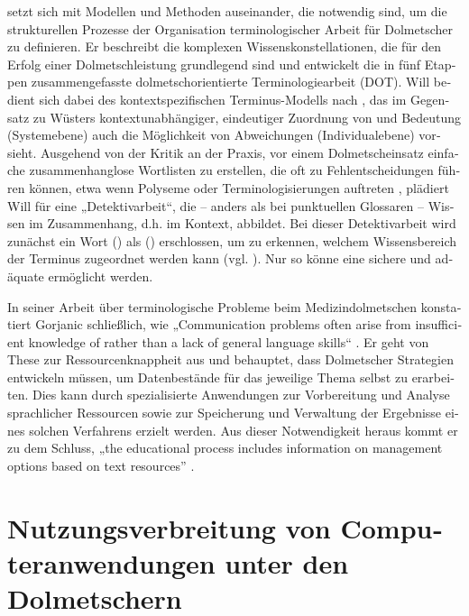 \documentclass[output=paper]{LSP/langsci}
\begin{document}
\begin{otherlanguage}{ngerman}
\largerpage
\citet{Will2009} setzt sich mit Modellen und Methoden auseinander, die notwendig sind, um die strukturellen Prozesse der Organisation terminologischer Arbeit für Dolmetscher zu definieren. Er beschreibt die komplexen Wissenskonstellationen, die für den Erfolg einer Dolmetschleistung grundlegend sind und entwickelt die in fünf Etappen zusammengefasste dolmetschorientierte Terminologiearbeit (DOT). Will bedient sich dabei des kontextspezifischen Terminus-Modells nach \citet{gerzymisch1996termini}, das im Gegensatz zu Wüsters kontextunabhängiger, eindeutiger Zuordnung von  und Bedeutung (Systemebene) auch die Möglichkeit von Abweichungen (Individualebene) vorsieht. Ausgehend von der Kritik an der Praxis, vor einem Dolmetscheinsatz einfache zusammenhanglose Wortlisten zu erstellen, die oft zu Fehlentscheidungen führen können, etwa wenn Polyseme oder Terminologisierungen auftreten \citep[6]{Will2009}, plädiert Will für eine „Detektivarbeit“, die -- anders als bei punktuellen Glossaren -- Wissen im Zusammenhang, d.h. im Kontext, abbildet. Bei dieser Detektivarbeit wird zunächst ein Wort () als  () erschlossen, um zu erkennen, welchem Wissensbereich der Terminus zugeordnet werden kann (vgl. \citealt{Will2010}). Nur so könne eine sichere und adäquate  ermöglicht werden.

In seiner Arbeit über terminologische Probleme beim Medizindolmetschen konstatiert Gorjanic schließlich, wie „Communication problems often arise from insufficient knowledge of  rather than a lack of general language skills“ \citep[85]{Gorjanc2009}. Er geht von \citet{Fantinuoli2006} These zur Ressourcenknappheit aus und behauptet, dass Dolmetscher Strategien entwickeln müssen, um Datenbestände für das jeweilige Thema selbst zu erarbeiten. Dies kann durch spezialisierte Anwendungen zur Vorbereitung und Analyse sprachlicher Ressourcen sowie zur Speicherung und Verwaltung der Ergebnisse eines solchen Verfahrens erzielt werden. Aus dieser Notwendigkeit heraus kommt er zu dem Schluss, „the educational process includes information on  management options based on text resources” \citep[89]{Gorjanc2009}.

\section{Nutzungsverbreitung von Computeranwendungen unter den Dolmetschern}\label{sec:fantinuoli:3}


\end{otherlanguage}
\end{document}
